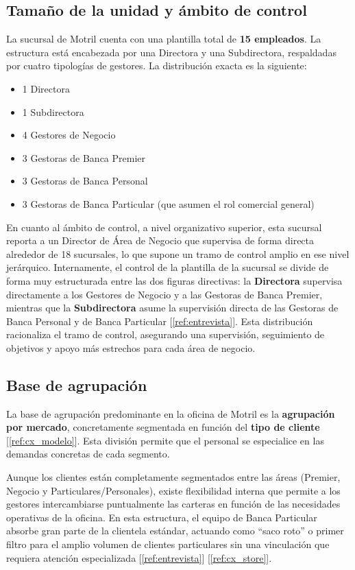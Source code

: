 \subsection*{Tamaño de la unidad y ámbito de control}
La sucursal de Motril cuenta con una plantilla total de \textbf{15 empleados}. La estructura está encabezada por una Directora y una Subdirectora, respaldadas por cuatro tipologías de gestores. La distribución exacta es la siguiente:
\begin{itemize}
    \item 1 Directora
    \item 1 Subdirectora
    \item 4 Gestores de Negocio
    \item 3 Gestoras de Banca Premier
    \item 3 Gestoras de Banca Personal
    \item 3 Gestoras de Banca Particular (que asumen el rol comercial general)
\end{itemize}

En cuanto al ámbito de control, a nivel organizativo superior, esta sucursal reporta a un Director de Área de Negocio que supervisa de forma directa alrededor de 18 sucursales, lo que supone un tramo de control amplio en ese nivel jerárquico. Internamente, el control de la plantilla de la sucursal se divide de forma muy estructurada entre las dos figuras directivas: la \textbf{Directora} supervisa directamente a los Gestores de Negocio y a las Gestoras de Banca Premier, mientras que la \textbf{Subdirectora} asume la supervisión directa de las Gestoras de Banca Personal y de Banca Particular [\ref{ref:entrevista}]. Esta distribución racionaliza el tramo de control, asegurando una supervisión, seguimiento de objetivos y apoyo más estrechos para cada área de negocio.

\subsection*{Base de agrupación}
La base de agrupación predominante en la oficina de Motril es la \textbf{agrupación por mercado}, concretamente segmentada en función del \textbf{tipo de cliente} [\ref{ref:cx_modelo}]. Esta división permite que el personal se especialice en las demandas concretas de cada segmento.

Aunque los clientes están completamente segmentados entre las áreas (Premier, Negocio y Particulares/Personales), existe flexibilidad interna que permite a los gestores intercambiarse puntualmente las carteras en función de las necesidades operativas de la oficina. En esta estructura, el equipo de Banca Particular absorbe gran parte de la clientela estándar, actuando como ``saco roto'' o primer filtro para el amplio volumen de clientes particulares sin una vinculación que requiera atención especializada [\ref{ref:entrevista}] [\ref{ref:cx_store}].

\endinput

